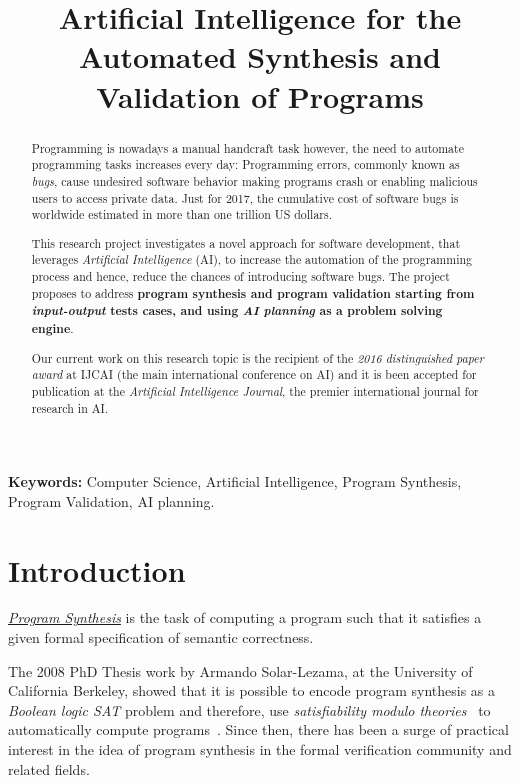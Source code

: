 \documentclass[10pt,a4paper]{paper}
\title{Artificial Intelligence for the Automated Synthesis and Validation of Programs}
\begin{document}
\maketitle

\begin{abstract}
  Programming is nowadays a manual handcraft task however, the need to automate programming tasks increases every day: Programming errors, commonly known as {\em bugs}, cause undesired software behavior making programs crash or enabling malicious users to access private data. Just for 2017, the cumulative cost of software bugs is worldwide estimated in more than one trillion US dollars. 

  This research project investigates a novel approach for software development, that leverages {\em Artificial Intelligence} (AI), to increase the automation of the programming process and hence, reduce the chances of introducing software bugs. The project proposes to address {\bf program synthesis and program validation starting from {\em input-output} tests cases, and using {\em AI planning} as a problem solving engine}.

  Our current work on this research topic is the recipient of the {\em 2016 distinguished paper award} at {\sc IJCAI} (the main international conference on AI) and it is been accepted for publication at the {\em Artificial Intelligence Journal}, the premier international journal for research in AI. 

\end{abstract}
{\footnotesize {\bf Keywords:} Computer Science, Artificial Intelligence, Program Synthesis, Program Validation, AI planning.}



\section{Introduction}
\label{sec:introduction}

{\underline{\em Program Synthesis}} is the task of computing a program such that it satisfies a given formal specification of semantic correctness.

The 2008 PhD Thesis work by Armando Solar-Lezama, at the University of California Berkeley, showed that it is possible to encode program synthesis as a {\em Boolean logic SAT} problem and therefore, use {\em satisfiability modulo theories}~\cite{barrett:SMT:2009} to automatically compute programs~\cite{lezama2008program}. Since then, there has been a surge of practical interest in the idea of program synthesis in the formal verification community and related fields.
\end{document}
